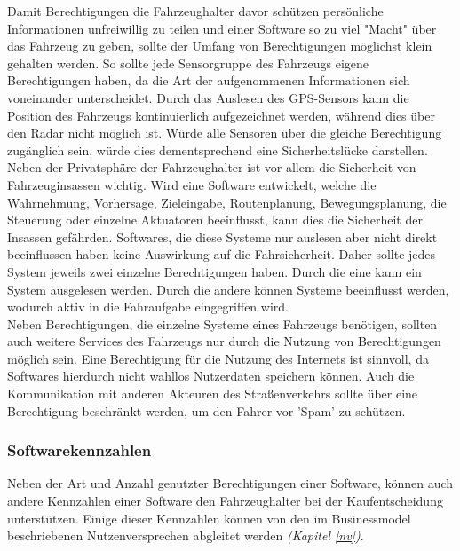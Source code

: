 Damit Berechtigungen die Fahrzeughalter davor schützen persönliche Informationen unfreiwillig zu teilen und einer Software so zu viel "Macht" über das Fahrzeug zu geben, sollte der Umfang von Berechtigungen möglichst klein gehalten werden. So sollte jede Sensorgruppe des Fahrzeugs eigene Berechtigungen haben, da die Art der aufgenommenen Informationen sich voneinander unterscheidet. Durch das Auslesen des GPS-Sensors kann die Position des Fahrzeugs kontinuierlich aufgezeichnet werden, während dies über den Radar nicht möglich ist. Würde alle Sensoren über die gleiche Berechtigung zugänglich sein, würde dies dementsprechend eine Sicherheitslücke darstellen.\\

Neben der Privatsphäre der Fahrzeughalter ist vor allem die Sicherheit von Fahrzeuginsassen wichtig. Wird eine Software entwickelt, welche die Wahrnehmung, Vorhersage, Zieleingabe, Routenplanung, Bewegungsplanung, die Steuerung oder einzelne Aktuatoren beeinflusst, kann dies die Sicherheit der Insassen gefährden. Softwares, die diese Systeme nur auslesen aber nicht direkt beeinflussen haben keine Auswirkung auf die Fahrsicherheit. Daher sollte jedes System jeweils zwei einzelne Berechtigungen haben. Durch die eine kann ein System ausgelesen werden. Durch die andere können Systeme beeinflusst werden, wodurch aktiv in die Fahraufgabe eingegriffen wird.\\

Neben Berechtigungen, die einzelne Systeme eines Fahrzeugs benötigen, sollten auch weitere Services des Fahrzeugs nur durch die Nutzung von Berechtigungen möglich sein. Eine Berechtigung für die Nutzung des Internets ist sinnvoll, da Softwares hierdurch nicht wahllos Nutzerdaten speichern können. Auch die Kommunikation mit anderen Akteuren des Straßenverkehrs sollte über eine Berechtigung beschränkt werden, um den Fahrer vor 'Spam' zu schützen.

\subsubsection{Softwarekennzahlen}
Neben der Art und Anzahl genutzter Berechtigungen einer Software, können auch andere Kennzahlen einer Software den Fahrzeughalter bei der Kaufentscheidung unterstützen. Einige dieser Kennzahlen können von den im Businessmodel beschriebenen Nutzenversprechen abgleitet werden \textit{(Kapitel \ref{nv})}.\\

